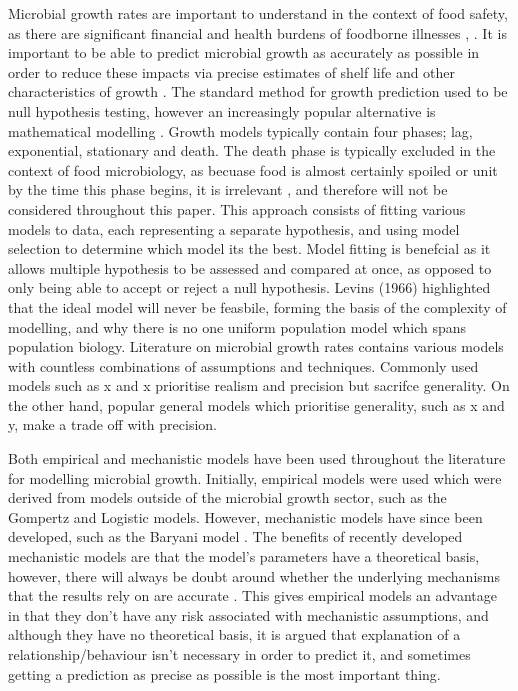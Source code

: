 \documentclass[11pt, titlepage]{article}
\begin{document}
    Microbial growth rates are important to understand in the context of food safety, as there are significant financial and health burdens of foodborne illnesses \cite{daniel2020burden}, \cite{world2015estimates}. It is important to be able to predict microbial growth as accurately as possible in order to reduce these impacts via precise estimates of shelf life and other characteristics of growth \cite{mcmeekin1996shelf}. The standard method for growth prediction used to be null hypothesis testing, however an increasingly popular alternative is mathematical modelling \cite{foegeding1997driving}. Growth models typically contain four phases; lag, exponential, stationary and death. The death phase is typically excluded in the context of food microbiology, as becuase food is almost certainly spoiled or unit by the time this phase begins, it is irrelevant \cite{ross2003modeling}, and therefore will not be considered throughout this paper. This approach consists of fitting various models to data, each representing a separate hypothesis, and using model selection to determine which model its the best. Model fitting is benefcial as it allows multiple hypothesis to be assessed and compared at once, as opposed to only being able to accept or reject a null hypothesis. Levins (1966) highlighted that the ideal model will never be feasbile, forming the basis of the complexity of modelling, and why there is no one uniform population model which spans population biology. Literature on microbial growth rates contains various models with countless combinations of assumptions and techniques. Commonly used models such as x and x prioritise realism and precision but sacrifce generality. On the other hand, popular general models which prioritise generality, such as x and y, make a trade off with precision.
    
    Both empirical and mechanistic models have been used throughout the literature for modelling microbial growth. Initially, empirical models were used which were derived from models outside of the microbial growth sector, such as the Gompertz and Logistic models. However, mechanistic models have since been developed, such as the Baryani model \cite{grijspeerdt1999estimating}. The benefits of recently developed mechanistic models are that the model's parameters have a theoretical basis, however, there will always be doubt around whether the underlying mechanisms that the results rely on are accurate \cite{lopez2004statistical}. This gives empirical models an advantage in that they don't have any risk associated with mechanistic assumptions, and although they have no theoretical basis, it is argued that explanation of a relationship/behaviour isn't necessary in order to predict it, and sometimes getting a prediction as precise as possible is the most important thing.
    
\end{document}
